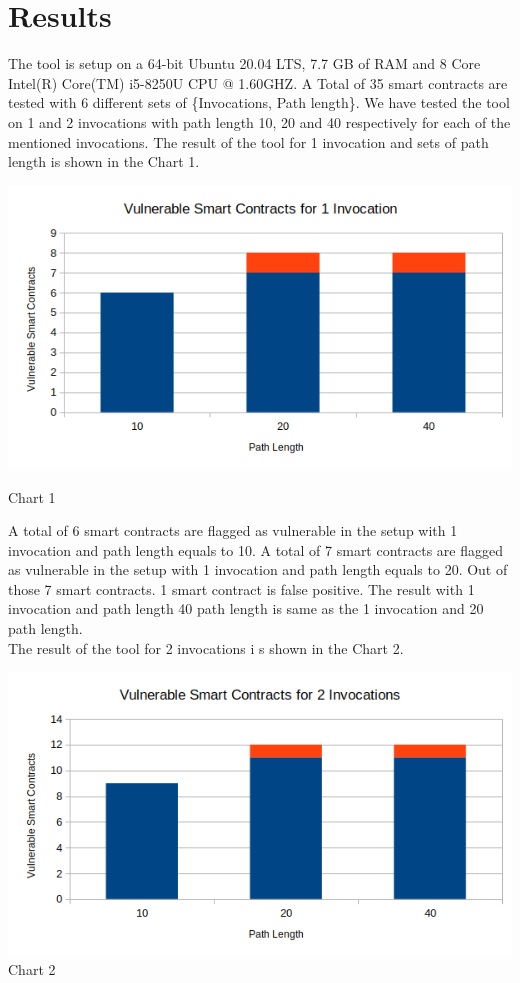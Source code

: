 \chapter{Results}
\label{ch:result}
The tool is setup on a 64-bit Ubuntu 20.04 LTS, 7.7 GB of RAM and 8 Core Intel(R) Core(TM) i5-8250U CPU @ 1.60GHZ. A Total of 35 smart contracts are tested with 6 different sets of \{Invocations, Path length\}. We have tested the tool on 1 and 2 invocations with path length 10, 20 and 40 respectively for each of the mentioned invocations.
The result of the tool for 1 invocation and sets of path length is shown in the Chart 1.\\
\begin{center}
\includegraphics[width= 15cm]{images/51.png}

    Chart 1
\end{center}
A total of 6 smart contracts are flagged as vulnerable in the setup with 1 invocation and path length equals to 10. A total of 7 smart contracts are flagged as vulnerable in the setup with 1 invocation and path length equals to 20. Out of those 7 smart contracts. 1 smart contract is false positive. The result with 1 invocation and path length 40 path length is same as the 1 invocation and 20 path length.\\
The result of the tool for 2 invocations i s shown in the Chart 2. 
\begin{center}
\includegraphics[width = 15cm]{images/52.png}
Chart 2
\end{center}
